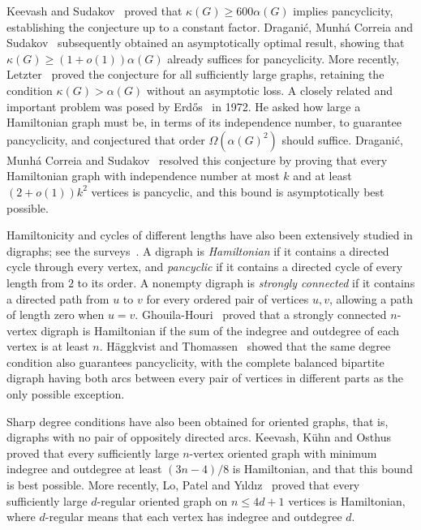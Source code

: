 \documentclass[11pt,a4paper]{article}
\theoremstyle{remark}
\numberwithin{equation}{section}
\begin{document}
Keevash and Sudakov~\cite{KS} proved that $\kappa(G)\ge 600\alpha(G)$ implies pancyclicity, establishing the conjecture up to a constant factor. Dragani\'c, Munh\'a Correia and Sudakov~\cite{DMSCE} subsequently obtained an asymptotically optimal result, showing that
$
\kappa(G)\ge (1+o(1))\alpha(G)
$
already suffices for pancyclicity.
More recently, Letzter~\cite{Letzter} proved the conjecture for all sufficiently large graphs, retaining the condition $\kappa(G)>\alpha(G)$ without an asymptotic loss.
A closely related and important problem was posed by Erd\H{o}s~\cite{ErdosCycles} in 1972. He asked how large a Hamiltonian graph must be, in terms of its independence number, to guarantee pancyclicity, and conjectured that order $\Omega(\alpha(G)^2)$ should suffice. Dragani\'c, Munh\'a Correia and Sudakov~\cite{DMSHam} resolved this conjecture by proving that every Hamiltonian graph with independence number at most $k$ and at least $(2+o(1))k^2$ vertices is pancyclic, and this bound is asymptotically best possible.

Hamiltonicity and cycles of different lengths have also been extensively studied in digraphs; see the surveys~\cite{JO,KO}.
A digraph is \emph{Hamiltonian} if it contains a directed cycle through every vertex, and \emph{pancyclic} if it contains a directed cycle of every length from $2$ to its order.
A nonempty digraph is \emph{strongly connected} if it contains a directed path from $u$ to $v$ for every ordered pair of vertices $u,v$, allowing a path of length zero when $u=v$.
Ghouila-Houri~\cite{GH} proved that a strongly connected $n$-vertex digraph is Hamiltonian if the sum of the indegree and outdegree of each vertex is at least $n$.
H\"aggkvist and Thomassen~\cite{HTPancyclic} showed that the same degree condition also guarantees pancyclicity, with the complete balanced bipartite digraph having both arcs between every pair of vertices in different parts as the only possible exception.

Sharp degree conditions have also been obtained for oriented graphs, that is, digraphs with no pair of oppositely directed arcs.
Keevash, K\"uhn and Osthus~\cite{KKO} proved that every sufficiently large $n$-vertex oriented graph with minimum indegree and outdegree at least $(3n-4)/8$ is Hamiltonian, and that this bound is best possible.
More recently, Lo, Patel and Y\i ld\i z~\cite{LPY} proved that every sufficiently large $d$-regular oriented graph on $n\le4d+1$ vertices is Hamiltonian, where $d$-regular means that each vertex has indegree and outdegree $d$.
\end{document}
